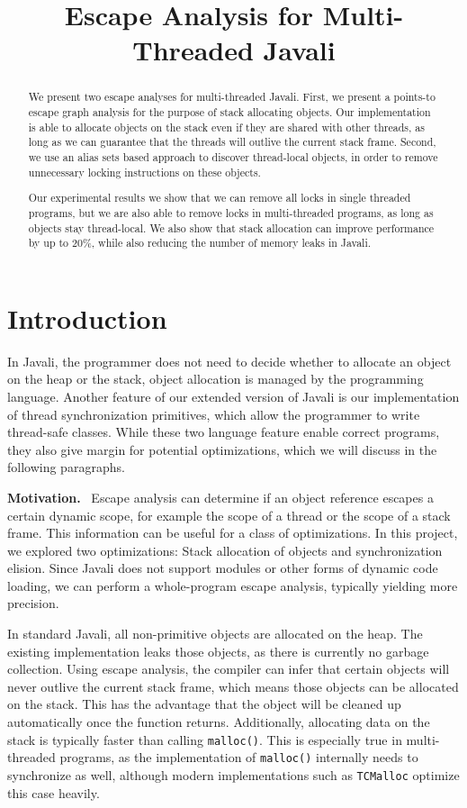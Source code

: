 \documentclass[letterpaper]{article}
\title{Escape Analysis for Multi-Threaded Javali}
\newcommand{\mypar}[1]{{\bf #1.}}
\begin{document}
%
\maketitle
%

\begin{abstract}

We present two escape analyses for multi-threaded Javali. First, we present
a points-to escape graph analysis for the purpose of stack allocating objects.
Our implementation is able to allocate objects on the stack even if they are
shared with other threads, as long as we can guarantee that the threads will
outlive the current stack frame.  Second, we use an alias sets based approach
to discover thread-local objects, in order to remove unnecessary locking
instructions on these objects.

Our experimental results we show that we can remove all locks in single threaded
programs, but we are also able to remove locks in multi-threaded programs, as
long as objects stay thread-local. We also show that stack allocation can
improve performance by up to 20\%, while also reducing the number of memory
leaks in Javali.
\end{abstract}

\section{Introduction}\label{sec:intro}

In Javali, the programmer does not need to decide whether to allocate an object
on the heap or the stack, object allocation is managed by the programming language.
Another feature of our extended version of Javali is our implementation of thread
synchronization primitives, which allow the programmer to write thread-safe
classes. While these two language feature enable correct programs, they also give margin
for potential optimizations, which we will discuss in the following paragraphs.

\mypar{Motivation} \
Escape analysis can determine if an object reference escapes a certain dynamic
scope, for example the scope of a thread or the scope of a stack frame. This
information can be useful for a class of optimizations. In this project, we
explored two optimizations: Stack allocation of objects and synchronization
elision. Since Javali does not support modules or other forms of dynamic code
loading, we can perform a whole-program escape analysis, typically yielding more
precision.

In standard Javali, all non-primitive objects are allocated on the heap. The
existing implementation leaks those objects, as there is currently no
garbage collection. Using escape analysis, the compiler can infer that certain
objects will never outlive the current stack frame, which means those objects can
be allocated on the stack. This has the advantage that the object will be cleaned
up automatically once the function returns. Additionally, allocating data on the
stack is typically faster than calling \texttt{malloc()}.
This is especially true in multi-threaded programs, as the implementation of
\texttt{malloc()} internally needs to synchronize as well, although modern
implementations such as \texttt{TCMalloc} \cite{TCMalloc} optimize this case heavily.
\end{document}
